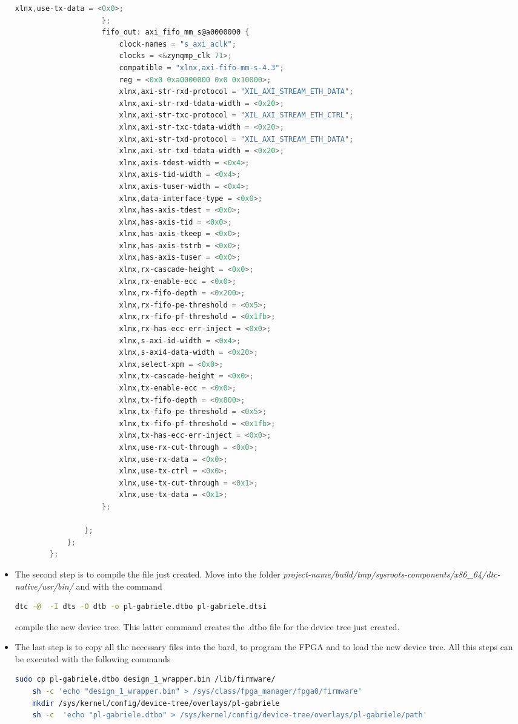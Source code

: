 \begin{itemize}
\begin{lstlisting}[language=C]
						xlnx,use-tx-data = <0x0>;
					};
					fifo_out: axi_fifo_mm_s@a0000000 {
						clock-names = "s_axi_aclk";
						clocks = <&zynqmp_clk 71>;
						compatible = "xlnx,axi-fifo-mm-s-4.3";
						reg = <0x0 0xa0000000 0x0 0x10000>;
						xlnx,axi-str-rxd-protocol = "XIL_AXI_STREAM_ETH_DATA";
						xlnx,axi-str-rxd-tdata-width = <0x20>;
						xlnx,axi-str-txc-protocol = "XIL_AXI_STREAM_ETH_CTRL";
						xlnx,axi-str-txc-tdata-width = <0x20>;
						xlnx,axi-str-txd-protocol = "XIL_AXI_STREAM_ETH_DATA";
						xlnx,axi-str-txd-tdata-width = <0x20>;
						xlnx,axis-tdest-width = <0x4>;
						xlnx,axis-tid-width = <0x4>;
						xlnx,axis-tuser-width = <0x4>;
						xlnx,data-interface-type = <0x0>;
						xlnx,has-axis-tdest = <0x0>;
						xlnx,has-axis-tid = <0x0>;
						xlnx,has-axis-tkeep = <0x0>;
						xlnx,has-axis-tstrb = <0x0>;
						xlnx,has-axis-tuser = <0x0>;
						xlnx,rx-cascade-height = <0x0>;
						xlnx,rx-enable-ecc = <0x0>;
						xlnx,rx-fifo-depth = <0x200>;
						xlnx,rx-fifo-pe-threshold = <0x5>;
						xlnx,rx-fifo-pf-threshold = <0x1fb>;
						xlnx,rx-has-ecc-err-inject = <0x0>;
						xlnx,s-axi-id-width = <0x4>;
						xlnx,s-axi4-data-width = <0x20>;
						xlnx,select-xpm = <0x0>;
						xlnx,tx-cascade-height = <0x0>;
						xlnx,tx-enable-ecc = <0x0>;
						xlnx,tx-fifo-depth = <0x800>;
						xlnx,tx-fifo-pe-threshold = <0x5>;
						xlnx,tx-fifo-pf-threshold = <0x1fb>;
						xlnx,tx-has-ecc-err-inject = <0x0>;
						xlnx,use-rx-cut-through = <0x0>;
						xlnx,use-rx-data = <0x0>;
						xlnx,use-tx-ctrl = <0x0>;
						xlnx,use-tx-cut-through = <0x1>;
						xlnx,use-tx-data = <0x1>;
					};
					
				};
			};
		};
	\end{lstlisting}
	\vspace{0.1cm}
	\item The second step is to compile the file just created. Move into the folder \textit{project-name/build/tmp/sysroots-components/x86\_64/dtc-native/usr/bin/} and with the command
	\vspace{0.1cm}
	\begin{lstlisting}[language=bash]
		dtc -@  -I dts -O dtb -o pl-gabriele.dtbo pl-gabriele.dtsi
	\end{lstlisting}
	compile the new device tree. This latter command creates the .dtbo file for the device tree just created.
	
	\item The last step is to copy all the necessary files into the bard, to program the FPGA and to load the new device tree. All this steps can be executed with the following commands
		\vspace{0.1cm}
	\begin{lstlisting}[language=bash]
	sudo cp pl-gabriele.dtbo design_1_wrapper.bin /lib/firmware/
	sh -c 'echo "design_1_wrapper.bin" > /sys/class/fpga_manager/fpga0/firmware'
	mkdir /sys/kernel/config/device-tree/overlays/pl-gabriele
	sh -c  'echo "pl-gabriele.dtbo" > /sys/kernel/config/device-tree/overlays/pl-gabriele/path'
	\end{lstlisting}
	\vspace{0.1cm}
\end{itemize}



